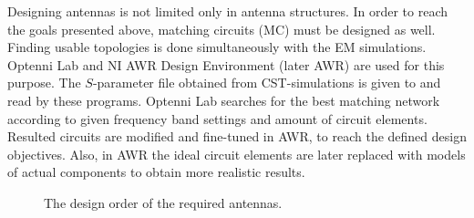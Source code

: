 Designing antennas is not limited only in antenna structures. In order to reach the goals presented above, matching circuits (MC) must be designed as well. Finding usable topologies is done simultaneously with the EM simulations. Optenni Lab \cite{optenni} and NI AWR Design Environment \cite{awr} (later AWR) are used for this purpose. The $S$-parameter file obtained from CST-simulations is given to and read by these programs. Optenni Lab searches for the best matching network according to given frequency band settings and amount of circuit elements. Resulted circuits are modified and fine-tuned in AWR, to reach the defined design objectives. Also, in AWR the ideal circuit elements are later replaced with models of actual components to obtain more realistic results.

\begin{figure}[H]
    \centering
        \caption{The design order of the required antennas.}
        \label{fig:ant_order}
\end{figure} 
    
